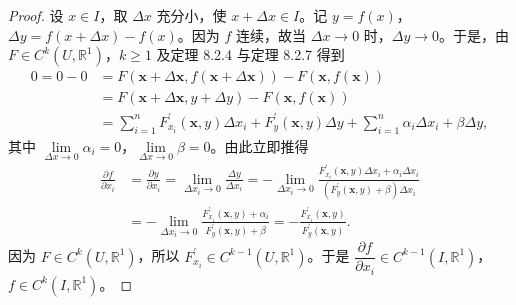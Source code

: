 \begin{proof}
设 $x \in I$，取 $\Delta x$ 充分小，使 $x + \Delta x \in I$。记 $y = f(x)$，$\Delta y = f(x + \Delta x) - f(x)$。因为 $f$ 连续，故当 $\Delta x \to 0$ 时，$\Delta y \to 0$。于是，由 $F \in C^{k}(U,\mathbb{R}^{1})$，$k \geqslant 1$ 及定理 8.2.4 与定理 8.2.7 得到
\begin{align*}
  0 = 0 - 0 &= F(\boldsymbol{x} + \Delta \boldsymbol{x},f(\boldsymbol{x} + \Delta \boldsymbol{x})) - F(\boldsymbol{x},f(\boldsymbol{x})) \\
  &= F(\boldsymbol{x} + \Delta \boldsymbol{x},y + \Delta y) - F(\boldsymbol{x},f(\boldsymbol{x})) \\
  &= \sum_{i=1}^{n} F_{x_{i}}^{\prime}(\boldsymbol{x},y) \Delta x_{i} + F_{y}^{\prime}(\boldsymbol{x},y) \Delta y + \sum_{i=1}^{n} \alpha_{i} \Delta x_{i} + \beta \Delta y,
\end{align*}
其中 $\lim\limits_{\Delta x \to 0} \alpha_{i} = 0$，$\lim\limits_{\Delta x \to 0} \beta = 0$。由此立即推得
\begin{align*}
  \frac{\partial f}{\partial x_{i}} &= \frac{\partial y}{\partial x_{i}} = \lim_{\Delta x_{i} \to 0} \frac{\Delta y}{\Delta x_{i}} = -\lim_{\Delta x_{i} \to 0} \frac{F_{x_{i}}^{\prime}(\boldsymbol{x},y) \Delta x_{i} + \alpha_{i} \Delta x_{i}}{\left(F_{y}^{\prime}(\boldsymbol{x},y) + \beta\right) \Delta x_{i}} \\
  &= -\lim_{\Delta x_{i} \to 0} \frac{F_{x_{i}}^{\prime}(\boldsymbol{x},y) + \alpha_{i}}{F_{y}^{\prime}(\boldsymbol{x},y) + \beta} = -\frac{F_{x_{i}}^{\prime}(\boldsymbol{x},y)}{F_{y}^{\prime}(\boldsymbol{x},y)}.
\end{align*}
因为 $F \in C^{k}(U,\mathbb{R}^{1})$，所以 $F_{x_{i}}^{\prime} \in C^{k-1}(U,\mathbb{R}^{1})$。于是 $\dfrac{\partial f}{\partial x_{i}} \in C^{k-1}(I,\mathbb{R}^{1})$，$f \in C^{k}(I,\mathbb{R}^{1})$。
\end{proof}

